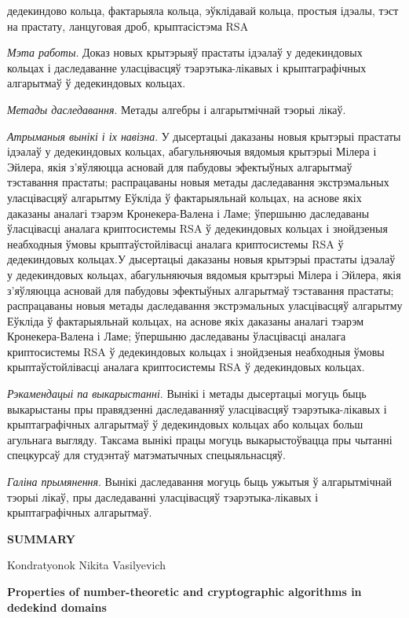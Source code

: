 \documentclass[_00_autoref.tex]{subfiles}
\begin{document}
\noindent
дедекиндово кольца, фактарыяла кольца, эўклідавай кольца, простыя ідэалы, тэст на прастату, ланцуговая дроб, крыптасістэма RSA

\textit{Мэта работы}.
Доказ новых крытэрыяў прастаты ідэалаў у дедекиндовых кольцах і даследаванне уласцівасцяў тэарэтыка-лікавых і крыптаграфічных алгарытмаў ў дедекиндовых кольцах.

\textit{Метады даследавання}.
Метады алгебры і алгарытмічнай тэорыі лікаў.

\textit{Атрыманыя вынікі і іх навізна}.
У дысертацыі даказаны новыя крытэрыі прастаты ідэалаў у дедекиндовых кольцах, абагульняючыя вядомыя крытэрыі Мілера і Эйлера, якія з'яўляюцца асновай для пабудовы эфектыўных алгарытмаў тэставання прастаты; распрацаваны новыя метады даследавання экстрэмальных уласцівасцяў алгарытму Еўкліда ў фактарыяльнай кольцах, на аснове якіх даказаны аналагі тэарэм Кронекера-Валена і Ламе; ўпершыню даследаваны ўласцівасці аналага криптосистемы RSA ў дедекиндовых кольцах і знойдзеныя неабходныя ўмовы крыптаўстойлівасці аналага криптосистемы RSA ў дедекиндовых кольцах.У дысертацыі даказаны новыя крытэрыі прастаты ідэалаў у дедекиндовых кольцах, абагульняючыя вядомыя крытэрыі Мілера і Эйлера, якія з'яўляюцца асновай для пабудовы эфектыўных алгарытмаў тэставання прастаты; распрацаваны новыя метады даследавання экстрэмальных уласцівасцяў алгарытму Еўкліда ў фактарыяльнай кольцах, на аснове якіх даказаны аналагі тэарэм Кронекера-Валена і Ламе; ўпершыню даследаваны ўласцівасці аналага криптосистемы RSA ў дедекиндовых кольцах і знойдзеныя неабходныя ўмовы крыптаўстойлівасці аналага криптосистемы RSA ў дедекиндовых кольцах.

\textit{Рэкамендацыі па выкарыстанні}.
Вынікі і метады дысертацыі могуць быць выкарыстаны пры правядзенні даследаванняў уласцівасцяў тэарэтыка-лікавых і крыптаграфічных алгарытмаў ў дедекиндовых кольцах або кольцах больш агульнага выгляду.
Таксама вынікі працы могуць выкарыстоўвацца пры чытанні спецкурсаў для студэнтаў матэматычных спецыяльнасцяў.

\textit{Галіна прымянення}.
Вынікі даследавання могуць быць ужытыя ў алгарытмічнай тэорыі лікаў, пры даследаванні уласцівасцяў тэарэтыка-лікавых і крыптаграфічных алгарытмаў.

\newpage
\centerline{\textbf{SUMMARY}}

\vspace{-0.3ex}
\begin{center}
Kondratyonok Nikita Vasilyevich

\textbf{Properties of number-theoretic and cryptographic algorithms in dedekind domains}
\end{center}
\vspace{-0.3ex}
\end{document}
